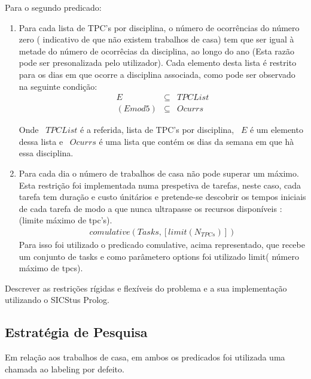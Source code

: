 \documentclass{llncs}
\begin{document}
Para o segundo predicado:
\begin{enumerate}
\item Para cada lista de TPC's por disciplina, o número de ocorrências do número zero ( indicativo de que não existem trabalhos de casa) tem que ser igual à metade do número de ocorrêcias da disciplina, ao longo do ano (Esta razão pode ser presonalizada pelo utilizador).
Cada elemento desta lista é restrito para os dias em que ocorre a disciplina associada, como pode ser observado na seguinte condição:
\begin{equation}
\begin{array}{rcl}
 E &\subseteq& TPCList \\
 (E mod 5) &\subseteq& Ocurrs
\end{array}
\end{equation}

Onde ~$TPCList$ é a referida, lista de TPC's por disciplina, ~$E$ é um elemento dessa lista e ~$Ocurrs$ é uma lista que contém os dias da semana em que hà essa disciplina.



\item Para cada dia o número de trabalhos de casa não pode superar um máximo.
Esta restrição foi implementada numa prespetiva de tarefas, neste caso, cada tarefa tem duração e custo únitários e pretende-se descobrir os tempos iniciais de cada tarefa de modo a que nunca ultrapasse os recursos disponíveis : (limite máximo de tpc's). 
\begin{equation}
\begin{array}{rcl}
 comulative( Tasks, [limit(N_{TPCs})])
\end{array}
\end{equation}
Para isso foi utilizado o predicado comulative, acima representado, que recebe um conjunto de tasks e como parâmetero options foi utilizado limit( número máximo de tpcs).

\end{enumerate}

 Descrever as restrições rígidas e flexíveis do problema e a sua implementação utilizando o SICStus Prolog.

\subsection{Estratégia de Pesquisa}

Em relação aos trabalhos de casa, em ambos os predicados foi utilizada uma chamada ao labeling por defeito.
\end{document}
